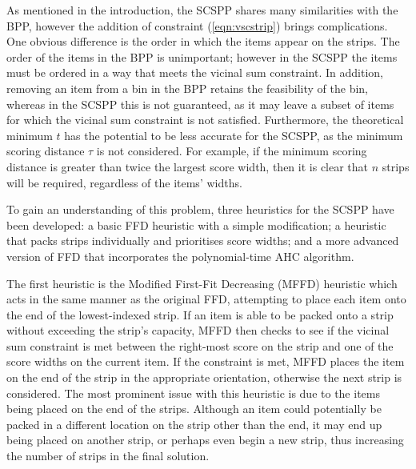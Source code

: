 \documentclass[runningheads]{llncs}
\begin{document}
As mentioned in the introduction, the SCSPP shares many similarities with the BPP, however the addition of constraint (\ref{eqn:vscstrip}) brings complications. One obvious difference is the order in which the items appear on the strips. The order of the items in the BPP is unimportant; however in the SCSPP the items must be ordered in a way that meets the vicinal sum constraint. In addition, removing an item from a bin in the BPP retains the feasibility of the bin, whereas in the SCSPP this is not guaranteed, as it may leave a subset of items for which the vicinal sum constraint is not satisfied. Furthermore, the theoretical minimum $t$ has the potential to be less accurate for the SCSPP, as the minimum scoring distance $\tau$ is not considered. For example, if the minimum scoring distance is greater than twice the largest score width, then it is clear that $n$ strips will be required, regardless of the items' widths.

To gain an understanding of this problem, three heuristics for the SCSPP have been developed: a basic FFD heuristic with a simple modification; a heuristic that packs strips individually and prioritises score widths; and a more advanced version of FFD that incorporates the polynomial-time AHC algorithm.

The first heuristic is the Modified First-Fit Decreasing (MFFD) heuristic which acts in the same manner as the original FFD, attempting to place each item onto the end of the lowest-indexed strip. If an item is able to be packed onto a strip without exceeding the strip's capacity, MFFD then checks to see if the vicinal sum constraint is met between the right-most score on the strip and one of the score widths on the current item. If the constraint is met, MFFD places the item on the end of the strip in the appropriate orientation, otherwise the next strip is considered. The most prominent issue with this heuristic is due to the items being placed on the end of the strips. Although an item could potentially be packed in a different location on the strip other than the end, it may end up being placed on another strip, or perhaps even begin a new strip, thus increasing the number of strips in the final solution.
\end{document}
